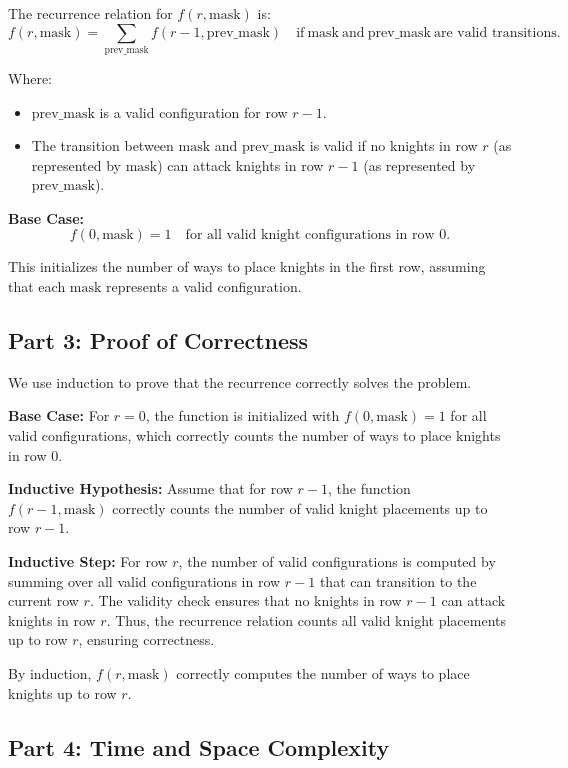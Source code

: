 \documentclass[11pt]{article}
\begin{document}
The recurrence relation for \( f(r, \text{mask}) \) is:
\[
f(r, \text{mask}) = \sum_{\text{prev\_mask}} f(r-1, \text{prev\_mask}) \quad \text{if} \ \text{mask} \ \text{and} \ \text{prev\_mask} \ \text{are valid transitions}.
\]

Where:
\begin{itemize}
    \item \( \text{prev\_mask} \) is a valid configuration for row \( r-1 \).
    \item The transition between \( \text{mask} \) and \( \text{prev\_mask} \) is valid if no knights in row \( r \) (as represented by \( \text{mask} \)) can attack knights in row \( r-1 \) (as represented by \( \text{prev\_mask} \)).
\end{itemize}

\textbf{Base Case:}
\[
f(0, \text{mask}) = 1 \quad \text{for all valid knight configurations in row 0}.
\]

This initializes the number of ways to place knights in the first row, assuming that each \( \text{mask} \) represents a valid configuration.

\subsection*{Part 3: Proof of Correctness}

We use induction to prove that the recurrence correctly solves the problem.

\textbf{Base Case:} For \( r = 0 \), the function is initialized with \( f(0, \text{mask}) = 1 \) for all valid configurations, which correctly counts the number of ways to place knights in row 0.

\textbf{Inductive Hypothesis:} Assume that for row \( r-1 \), the function \( f(r-1, \text{mask}) \) correctly counts the number of valid knight placements up to row \( r-1 \).

\textbf{Inductive Step:} For row \( r \), the number of valid configurations is computed by summing over all valid configurations in row \( r-1 \) that can transition to the current row \( r \). The validity check ensures that no knights in row \( r-1 \) can attack knights in row \( r \). Thus, the recurrence relation counts all valid knight placements up to row \( r \), ensuring correctness.

By induction, \( f(r, \text{mask}) \) correctly computes the number of ways to place knights up to row \( r \).

\subsection*{Part 4: Time and Space Complexity}
\end{document}
